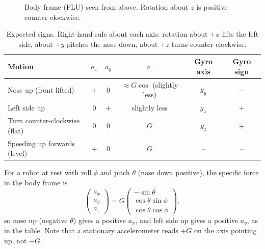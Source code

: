 \documentclass[11pt,a4paper]{report}
\begin{document}
\begin{figure}[H]
\centering
{}
\caption{Body frame (FLU) seen from above. Rotation about $z$ is positive counter-clockwise.}\label{fig:frame}
\end{figure}

\begin{table}[H]
\centering
\caption{Expected signs. Right-hand rule about each axis: rotation about $+x$ lifts the left side, about $+y$ pitches the nose down, about $+z$ turns counter-clockwise.}\label{tab:signs}
\small
\begin{tabular}{@{}lccccc@{}}
\toprule
Motion & $a_x$ & $a_y$ & $a_z$ & Gyro axis & Gyro sign\\
\midrule
Nose up (front lifted) & $+$ & 0 & $\approx G\cos$ (slightly less) & $g_y$ & $-$\\
Left side up & 0 & $+$ & slightly less & $g_x$ & $+$\\
Turn counter-clockwise (flat) & 0 & 0 & $G$ & $g_z$ & $+$\\
Speeding up forwards (level) & $+$ & 0 & $G$ & -- & --\\
\bottomrule
\end{tabular}
\end{table}

For a robot at rest with roll $\phi$ and pitch $\theta$ (nose down positive), the specific force in the body frame is
\begin{equation}
  \begin{pmatrix}a_x\\a_y\\a_z\end{pmatrix}=G\begin{pmatrix}-\sin\theta\\ \cos\theta\sin\phi\\ \cos\theta\cos\phi\end{pmatrix}, \label{eq:gravity}
\end{equation}
so nose up (negative $\theta$) gives a positive $a_x$, and left side up gives a positive $a_y$, as in the table. Note that a stationary accelerometer reads $+G$ on the axis pointing up, not $-G$.
\end{document}
